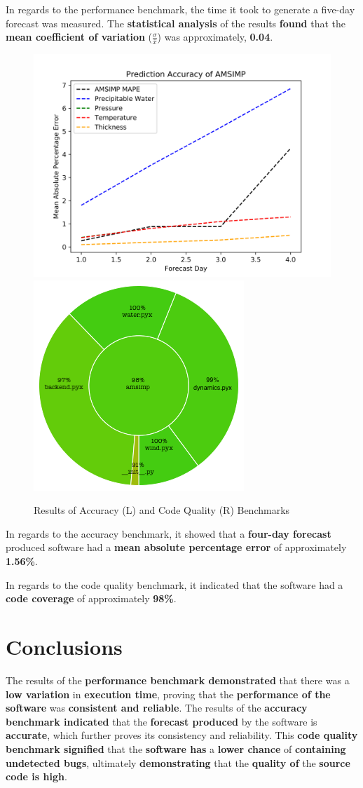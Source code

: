\documentclass[thesis]{poster_style}
\begin{document}
\begin{poster}
In regards to the performance benchmark, the time it took to generate a five-day forecast was measured. The
\textbf{statistical analysis} of the results \textbf{found} that the \textbf{mean coefficient of variation} 
($\frac{\sigma}{\bar{x}}$) was approximately, \textbf{0.04}.

\begin{center}
    \begin{figure}
        \includegraphics[width=.5\linewidth]{mape_graph.png}
        \includegraphics[width=.36\linewidth]{code_coverage.png}
        \caption{Results of Accuracy (L) and Code Quality (R) Benchmarks}
    \end{figure}
\end{center}

In regards to the accuracy benchmark, it showed that a \textbf{four-day forecast}
produced software had a \textbf{mean absolute percentage error}
of approximately \textbf{1.56\%}.

In regards to the code quality benchmark, it indicated
that the software had a \textbf{code coverage} of approximately \textbf{98\%}.

\section{Conclusions}
The results of the \textbf{performance benchmark demonstrated} that there was a \textbf{low variation} 
in \textbf{execution time}, proving that the \textbf{performance of the software}
was \textbf{consistent and reliable}. The results of the \textbf{accuracy benchmark indicated}
that the \textbf{forecast produced} by the software is \textbf{accurate}, which further proves its consistency and reliability. This \textbf{code quality benchmark signified}
that the \textbf{software has} a \textbf{lower chance} of \textbf{containing undetected bugs}, ultimately
\textbf{demonstrating} that the \textbf{quality of} the \textbf{source code is high}.

\end{poster}
\end{document}

